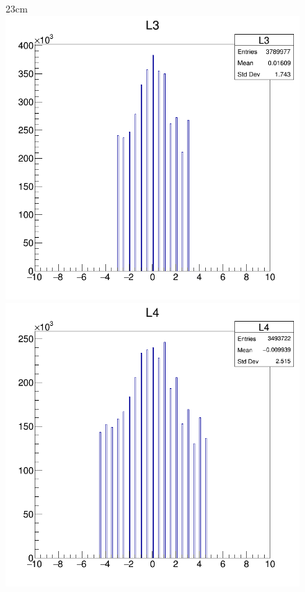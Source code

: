 \begin{landscape}
\begin{figure}[htbp]{23cm}
		\includegraphics[scale=0.26]{AppendixCMSL1TT/figs/JetPt250_PU200_deltaS_l3}\\
		\includegraphics[scale=0.26]{AppendixCMSL1TT/figs/JetPt250_PU200_deltaS_l4}

\end{figure}
\end{landscape}
